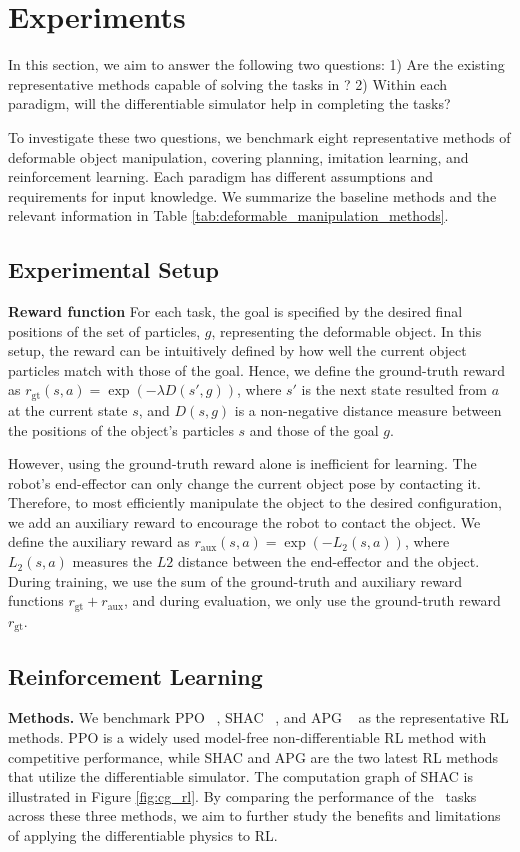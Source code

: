 \section{Experiments}
In this section, we aim to answer the following two questions: 1) Are the existing representative methods capable of solving the tasks in \algo? 2) Within each paradigm, will the differentiable simulator help in completing the tasks?

To investigate these two questions, we benchmark eight representative methods of deformable object manipulation, covering planning, imitation learning, and reinforcement learning. Each paradigm has different assumptions and requirements for input knowledge. We summarize the baseline methods and the relevant information in Table \ref{tab:deformable_manipulation_methods}. 

\subsection{Experimental Setup}



\textbf{Reward function} For each task, the goal is specified by the desired final positions of the set of particles, $g$, representing the deformable object. In this setup, the reward can be intuitively defined by how well the current object particles match with those of the goal. Hence, we define the ground-truth reward as
$r_{\text{gt}}(s, a) = \exp(- \lambda D(s',g))$,
where $s'$ is the next state resulted from $a$ at the current state $s$, and $ D (s,g)$ is a non-negative distance measure between the positions of the object's particles $s$ and those of the goal $g$.

However, using the ground-truth reward alone is inefficient for learning.
The robot's end-effector can only change the current object pose by contacting it. Therefore, to most efficiently manipulate the object to the desired configuration, we add an auxiliary reward to encourage the robot to contact the object. We define the auxiliary reward as
$r_{\text{aux}}(s, a) = \exp(- L_2(s, a))$,
where $L_2(s, a)$ measures the $L2$ distance between the end-effector and the object. During training, we use the sum of the ground-truth and auxiliary reward functions $r_{\text{gt}} + r_{\text{aux}}$, and during evaluation, we only use the ground-truth reward $r_{\text{gt}}$.

\subsection{Reinforcement Learning}

\textbf{Methods.} We benchmark PPO ~\citep{PPO}, SHAC ~\citep{SHAC}, and APG ~\citep{Brax} as the representative RL methods. PPO is a widely used model-free non-differentiable RL method with competitive performance, while SHAC and APG are the two latest RL methods that utilize the differentiable simulator. The computation graph of SHAC is illustrated in Figure \ref{fig:cg_rl}. By comparing the performance of the \algo\ tasks across these three methods, we aim to further study the benefits and limitations of applying the differentiable physics to RL.

